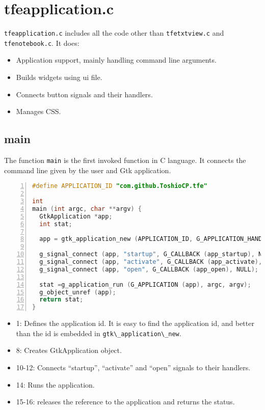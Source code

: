 \hypertarget{tfeapplication.c}{%
\section{tfeapplication.c}\label{tfeapplication.c}}

\passthrough{\lstinline!tfeapplication.c!} includes all the code other
than \passthrough{\lstinline!tfetxtview.c!} and
\passthrough{\lstinline!tfenotebook.c!}. It does:

\begin{itemize}
\tightlist
\item
  Application support, mainly handling command line arguments.
\item
  Builds widgets using ui file.
\item
  Connects button signals and their handlers.
\item
  Manages CSS.
\end{itemize}

\hypertarget{main}{%
\subsection{main}\label{main}}

The function \passthrough{\lstinline!main!} is the first invoked
function in C language. It connects the command line given by the user
and Gtk application.

\begin{lstlisting}[language=C, numbers=left]
#define APPLICATION_ID "com.github.ToshioCP.tfe"

int
main (int argc, char **argv) {
  GtkApplication *app;
  int stat;

  app = gtk_application_new (APPLICATION_ID, G_APPLICATION_HANDLES_OPEN);

  g_signal_connect (app, "startup", G_CALLBACK (app_startup), NULL);
  g_signal_connect (app, "activate", G_CALLBACK (app_activate), NULL);
  g_signal_connect (app, "open", G_CALLBACK (app_open), NULL);

  stat =g_application_run (G_APPLICATION (app), argc, argv);
  g_object_unref (app);
  return stat;
}
\end{lstlisting}

\begin{itemize}
\tightlist
\item
  1: Defines the application id. It is easy to find the application id,
  and better than the id is embedded in
  \passthrough{\lstinline!gtk\_application\_new!}.
\item
  8: Creates GtkApplication object.
\item
  10-12: Connects ``startup'', ``activate'' and ``open'' signals to
  their handlers.
\item
  14: Runs the application.
\item
  15-16: releases the reference to the application and returns the
  status.
\end{itemize}

